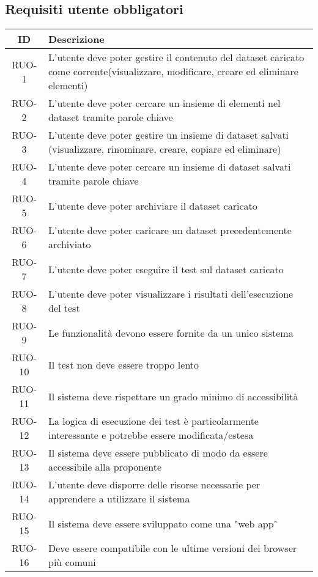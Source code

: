 \subsection{Requisiti utente obbligatori}
\begin{tabularx}{\textwidth}{|c|X|}
    \hline
    \textbf{ID} & \textbf{Descrizione} \\
    \hline
    \label{ru:RUO-1} RUO-1 & L'utente deve poter gestire il contenuto del dataset caricato come corrente(visualizzare, modificare, creare ed eliminare elementi)\\ 
    \hline
    \label{ru:RUO-2} RUO-2 & L'utente deve poter cercare un insieme di elementi nel dataset tramite parole chiave \\ 
    \hline
    \label{ru:RUO-3} RUO-3 & L'utente deve poter gestire un insieme di dataset salvati (visualizzare, rinominare, creare, copiare ed eliminare)\\ \hline
    \label{ru:RUO-4} RUO-4 & L'utente deve poter cercare un insieme di dataset salvati tramite parole chiave \\ 
    \hline
    \label{ru:RUO-5} RUO-5 & L'utente deve poter archiviare il dataset caricato \\ 
    \hline
    \label{ru:RUO-6} RUO-6 & L'utente deve poter caricare un dataset precedentemente archiviato \\ 
    \hline
    \label{ru:RUO-7} RUO-7 & L'utente deve poter eseguire il test sul dataset caricato \\ \hline
    \label{ru:RUO-8} RUO-8 & L'utente deve poter visualizzare i risultati dell'esecuzione del test \\ \hline
    \label{ru:RUO-9} RUO-9 & Le funzionalità devono essere fornite da un unico sistema\\ \hline
    \label{ru:RUO-10} RUO-10 & Il test non deve essere troppo lento \\ 
    \hline 
    \label{ru:RUO-11} RUO-11 & Il sistema deve rispettare un grado minimo di accessibilità \\ 
    \hline
    \label{ru:RUO-12} RUO-12 & La logica di esecuzione dei test è particolarmente interessante e potrebbe essere modificata/estesa \\ 
    \hline
    \label{ru:RUO-13} RUO-13 & Il sistema deve essere pubblicato di modo da essere accessibile alla proponente \\ 
    \hline
    \label{ru:RUO-14} RUO-14 & L'utente deve disporre delle risorse necessarie per apprendere a utilizzare il sistema \\ 
    \hline
    \label{ru:RUO-15} RUO-15 &  Il sistema deve essere sviluppato come una "web app"\\ 
    \hline
    \label{ru:RUO-16} RUO-16 &  Deve essere compatibile con le ultime versioni dei browser più comuni \\ 
    \hline 
\end{tabularx}

